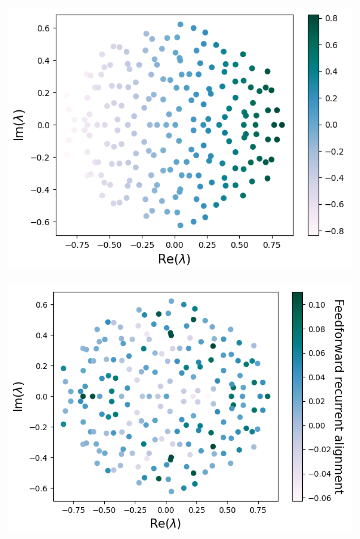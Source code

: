\documentclass[11pt]{article}
\begin{document}
		\begin{figure}
			\centering
			\begin{subfigure}[b]{0.4\textwidth}
				\includegraphics[width=\textwidth]{../figures/ffrec_eigval_real_part.png}
				\caption{}
				\label{fig:ffrec_real_part}
			\end{subfigure}
			\begin{subfigure}[b]{0.425\textwidth}
				\includegraphics[width=\textwidth]{../figures/ffrec_eigval_mag.png}
				\caption{}
				\label{fig:ffrec_mag}
			\end{subfigure}

\end{figure}
\end{document}
